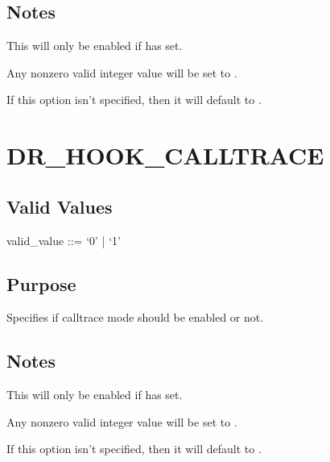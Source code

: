 \documentclass[letterpaper,10pt,english]{sphinxmanual}
\begin{document}
\subsection{Notes}
\label{\detokenize{flag/flag:id267}}
\sphinxAtStartPar
This will only be enabled if {\hyperref[\detokenize{flag/flag:dr-hook-opt}]{}} has  set.

\sphinxAtStartPar
Any non\sphinxhyphen{}zero valid integer value will be set to .

\sphinxAtStartPar
If this option isn’t specified, then it will default to .


\section{DR\_HOOK\_CALLTRACE}
\label{\detokenize{flag/flag:dr-hook-calltrace}}\label{\detokenize{flag/flag:id270}}

\subsection{Valid Values}
\label{\detokenize{flag/flag:id271}}
\begin{DUlineblock}{0em}
\item[] valid\_value ::= ‘0’ | ‘1’
\end{DUlineblock}


\subsection{Purpose}
\label{\detokenize{flag/flag:id272}}
\sphinxAtStartPar
Specifies if calltrace mode should be enabled or not.


\subsection{Notes}
\label{\detokenize{flag/flag:id273}}
\sphinxAtStartPar
This will only be enabled if {\hyperref[\detokenize{flag/flag:dr-hook-opt}]{}} has  set.

\sphinxAtStartPar
Any non\sphinxhyphen{}zero valid integer value will be set to .

\sphinxAtStartPar
If this option isn’t specified, then it will default to .
\end{document}
